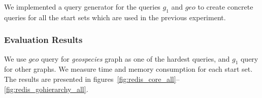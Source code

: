 
We implemented a query generator for the queries $g_1$ and $geo$ to create concrete queries for all the start sets which are used in the previous experiment.


\subsubsection{Evaluation Results}

We use $geo$ query for \textit{geospecies} graph as one of the hardest queries, and $g_1$ query for other graphs.
We measure time and memory consumption for each start set.
The results are presented in figures~\ref{fig:redis_core_all}--\ref{fig:redis_gohierarchy_all}.

%
%
%
%
%

